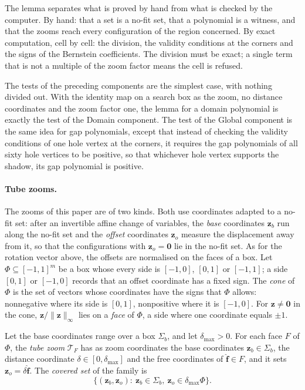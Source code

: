 The lemma separates what is proved by hand from what is checked by the
computer. By hand: that a set is a no-fit set, that a polynomial is a
witness, and that the zooms reach every configuration of the region
concerned. By exact computation, cell by cell: the division, the validity
conditions at the corners and the signs of the Bernstein coefficients.
The division must be exact; a single term that is not a multiple of the
zoom factor means the cell is refused.

The tests of the preceding components are the simplest case, with nothing
divided out. With the identity map on a search box as the zoom, no distance
coordinates and the zoom factor one, the lemma for a domain polynomial is
exactly the test of the Domain component. The test of the Global component
is the same idea for gap polynomials, except that instead of checking the
validity conditions of one hole vertex at the corners, it requires the gap
polynomials of all sixty hole vertices to be positive, so that whichever
hole vertex supports the shadow, its gap polynomial is positive.

\paragraph{Tube zooms.}
The zooms of this paper are of two kinds. Both use coordinates adapted to a
no-fit set: after an invertible affine change of variables, the
\emph{base} coordinates $\mathbf z_b$ run along the no-fit set and the
\emph{offset} coordinates $\mathbf z_o$ measure the displacement away from
it, so that the configurations with $\mathbf z_o=\mathbf0$ lie in the no-fit
set. As for the rotation vector above, the offsets are normalised on the
faces of a box. Let $\Phi\subseteq{[-1,1]}^m$ be a box whose every side is
$[-1,0]$, $[0,1]$ or $[-1,1]$; a side $[0,1]$ or $[-1,0]$ records that an
offset coordinate has a fixed sign. The \emph{cone} of $\Phi$ is the set of
vectors whose coordinates have the signs that $\Phi$ allows: nonnegative
where its side is $[0,1]$, nonpositive where it is $[-1,0]$. For
$\mathbf z\ne\mathbf0$ in the cone, $\mathbf z/\lVert\mathbf z\rVert_\infty$
lies on a \emph{face} of $\Phi$, a side where one coordinate equals $\pm1$.

Let the base coordinates range over a box $\Sigma_b$, and let
$\delta_{\max}>0$. For each face $F$ of $\Phi$, the \emph{tube zoom}
$\mathcal T_F$ has as zoom coordinates the base coordinates
$\mathbf z_b\in\Sigma_b$, the distance coordinate $\delta\in[0,\delta_{\max}]$
and the free coordinates of $\widehat{\mathbf f}\in F$, and it sets
$\mathbf z_o=\delta\widehat{\mathbf f}$. The \emph{covered set} of the
family is
\begin{equation}\label{eq:tube-covered-set}
  \{(\mathbf z_b,\mathbf z_o):\ \mathbf z_b\in\Sigma_b,\ \mathbf z_o\in\delta_{\max}\Phi\}.
\end{equation}

